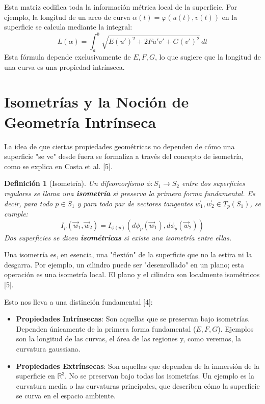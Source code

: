 \documentclass[12pt, a4paper]{report}
\theoremstyle{miestilo}
\theoremstyle{midefinicion}
\newtheorem{definicion}[teorema]{Definición}
\begin{document}
Esta matriz codifica toda la información métrica local de la superficie. Por ejemplo, la longitud de un arco de curva $\alpha(t) = \varphi(u(t), v(t))$ en la superficie se calcula mediante la integral:
$$L(\alpha) = \int_a^b \sqrt{E(u')^2 + 2F u'v' + G(v')^2} \, dt$$
Esta fórmula depende exclusivamente de $E, F, G$, lo que sugiere que la longitud de una curva es una propiedad intrínseca.

\section{Isometrías y la Noción de Geometría Intrínseca}

La idea de que ciertas propiedades geométricas no dependen de cómo una superficie "se ve" desde fuera se formaliza a través del concepto de isometría, como se explica en Costa et al. [5].

\begin{definicion}[Isometría]
Un difeomorfismo $\phi: S_1 \to S_2$ entre dos superficies regulares se llama una \textbf{isometría} si preserva la primera forma fundamental. Es decir, para todo $p \in S_1$ y para todo par de vectores tangentes $\vec{w}_1, \vec{w}_2 \in T_p(S_1)$, se cumple:
$$I_p(\vec{w}_1, \vec{w}_2) = I_{\phi(p)}(d\phi_p(\vec{w}_1), d\phi_p(\vec{w}_2))$$
Dos superficies se dicen \textbf{isométricas} si existe una isometría entre ellas.
\end{definicion}

Una isometría es, en esencia, una "flexión" de la superficie que no la estira ni la desgarra. Por ejemplo, un cilindro puede ser "desenrollado" en un plano; esta operación es una isometría local. El plano y el cilindro son localmente isométricos [5].

Esto nos lleva a una distinción fundamental [4]:
\begin{itemize}
    \item \textbf{Propiedades Intrínsecas}: Son aquellas que se preservan bajo isometrías. Dependen únicamente de la primera forma fundamental ($E, F, G$). Ejemplos son la longitud de las curvas, el área de las regiones y, como veremos, la curvatura gaussiana.
    \item \textbf{Propiedades Extrínsecas}: Son aquellas que dependen de la inmersión de la superficie en $\mathbb{R}^3$. No se preservan bajo todas las isometrías. Un ejemplo es la curvatura media o las curvaturas principales, que describen cómo la superficie se curva en el espacio ambiente.
\end{itemize}
\end{document}
